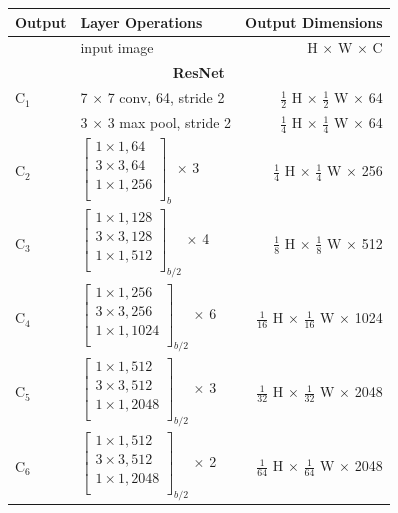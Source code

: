 {
\begin{table}[h]
\centering
\begin{tabular}{llr}
\toprule
\textbf{Output} & \textbf{Layer Operations} & \textbf{Output Dimensions} \\
\midrule\midrule
 & input image & H $\times$ W $\times$ C \\
\midrule
\multicolumn{3}{c}{\textbf{ResNet}}\\
\midrule
C$_1$ & 7 $\times$ 7 conv, 64, stride 2 & $\tfrac{1}{2}$ H $\times$ $\tfrac{1}{2}$ W $\times$ 64 \\
\midrule
& 3 $\times$ 3 max pool, stride 2 & $\tfrac{1}{4}$ H $\times$ $\tfrac{1}{4}$ W $\times$ 64 \\
\midrule
C$_2$ &
$\begin{bmatrix}
1 \times 1, 64 \\
3 \times 3, 64 \\
1 \times 1, 256 \\
\end{bmatrix}_b$ $\times$ 3
& $\tfrac{1}{4}$ H $\times$ $\tfrac{1}{4}$ W $\times$ 256 \\
\midrule
C$_3$ &
$\begin{bmatrix}
1 \times 1, 128 \\
3 \times 3, 128 \\
1 \times 1, 512 \\
\end{bmatrix}_{b/2}$ $\times$ 4
& $\tfrac{1}{8}$ H $\times$ $\tfrac{1}{8}$ W $\times$ 512 \\
\midrule
C$_4$ &
$\begin{bmatrix}
1 \times 1, 256 \\
3 \times 3, 256 \\
1 \times 1, 1024 \\
\end{bmatrix}_{b/2}$ $\times$ 6
& $\tfrac{1}{16}$ H $\times$ $\tfrac{1}{16}$ W $\times$ 1024 \\
\midrule
C$_5$ &
$\begin{bmatrix}
1 \times 1, 512 \\
3 \times 3, 512 \\
1 \times 1, 2048 \\
\end{bmatrix}_{b/2}$ $\times$ 3
& $\tfrac{1}{32}$ H $\times$ $\tfrac{1}{32}$ W $\times$ 2048 \\
\midrule
C$_6$ &
$\begin{bmatrix}
1 \times 1, 512 \\
3 \times 3, 512 \\
1 \times 1, 2048 \\
\end{bmatrix}_{b/2}$ $\times$ 2
& $\tfrac{1}{64}$ H $\times$ $\tfrac{1}{64}$ W $\times$ 2048 \\


\end{tabular}
\end{table}}
